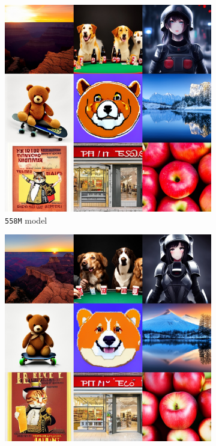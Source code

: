 \begin{figure}[!t]
    \begin{subfigure}[b]{0.32\textwidth}
    \centering
    \includegraphics[width=\textwidth]{cp2/figures/t2i/c256.jpg}
    \caption{\texttt{558M} model}
    \end{subfigure}
    \begin{subfigure}[b]{0.32\textwidth}
    \centering
    \includegraphics[width=\textwidth]{cp2/figures/t2i/c320.jpg}

\end{subfigure}
\end{figure}

